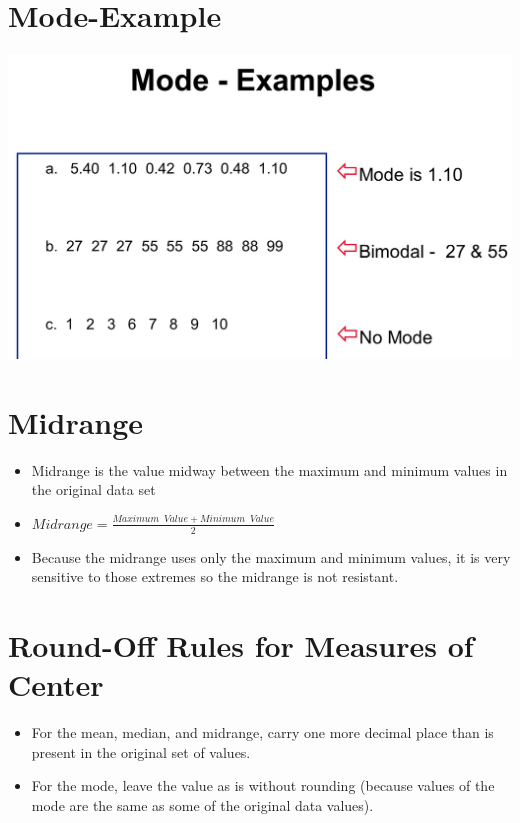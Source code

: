 \documentclass[]{book}
\providecommand{\tightlist}{%
  \setlength{\itemsep}{0pt}\setlength{\parskip}{0pt}}
\begin{document}
\hypertarget{mode-example}{%
\section{Mode-Example}\label{mode-example}}

\includegraphics{pic8.jpg}

\hypertarget{midrange}{%
\section{Midrange}\label{midrange}}

\begin{itemize}
\tightlist
\item
  Midrange is the value midway between the maximum and minimum values in the original data set
\item
  \(Midrange=\frac{Maximum \enspace Value +Minimum \enspace Value}{2}\)
\item
  Because the midrange uses only the maximum and minimum values, it is very sensitive to those extremes so the midrange is not resistant.
\end{itemize}

\hypertarget{round-off-rules-for-measures-of-center}{%
\section{Round-Off Rules for Measures of Center}\label{round-off-rules-for-measures-of-center}}

\begin{itemize}
\tightlist
\item
  For the mean, median, and midrange, carry one more decimal place than is present in the original set of values.
\item
  For the mode, leave the value as is without rounding (because values of the mode are the same as some of the original data values).
\end{itemize}
\end{document}
